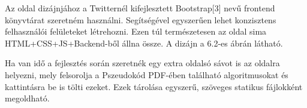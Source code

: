 Az oldal dizájnjához a Twitternél kifejlesztett Bootstrap[3] nevű frontend könyvtárat szeretném használni. Segítségével egyszerűen lehet konzisztens felhasználói felületeket létrehozni. Ezen túl természetesen az oldal sima HTML+CSS+JS+Backend-ből állna össze. A dizájn a 6.2-es ábrán látható.

Ha van idő a fejlesztés során szeretnék egy extra oldalsó sávot is az oldalra helyezni, mely felsorolja a Pszeudokód PDF-ében található algoritmusokat és kattintásra be is tölti ezeket. Ezek tárolása egyszerű, szöveges statikus fájlokként megoldható.